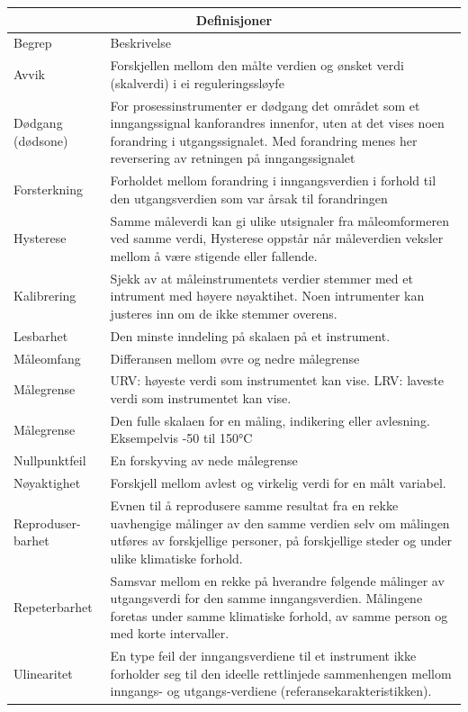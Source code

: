 \documentclass[10pt,a5paper]{article}
\begin{document}
\begin{center}
\begin{longtable}{ | m{2cm} | m{7cm} | } 
\hline
\multicolumn{2}{|c|}{Definisjoner} \\
\hline
Begrep	& Beskrivelse \\ 
\hline
\hline
	Avvik&Forskjellen mellom den målte verdien og ønsket verdi (skalverdi) i ei reguleringssløyfe\\
	\hline
	Dødgang (dødsone)&For prosessinstrumenter er dødgang det området som et inngangssignal kanforandres innenfor, uten at det vises noen forandring i utgangssignalet. Med forandring menes her reversering av retningen på inngangssignalet\\
	\hline
	Forsterkning&Forholdet mellom forandring i inngangsverdien i forhold til den utgangsverdien som var årsak til forandringen\\
	\hline
	Hysterese&Samme måleverdi kan gi ulike utsignaler fra måleomformeren ved samme verdi, Hysterese oppstår når måleverdien veksler mellom å være stigende eller fallende.\\
	\hline
	Kalibrering&Sjekk av at måleinstrumentets verdier stemmer med et intrument med høyere nøyaktihet. Noen intrumenter kan justeres inn om de ikke stemmer overens.\\ 
	\hline
	Lesbarhet&Den minste inndeling på skalaen på et instrument.\\
	\hline
	Måleomfang&Differansen mellom øvre og nedre målegrense\\
	\hline
	Målegrense&URV: høyeste verdi som instrumentet kan vise. LRV: laveste verdi som instrumentet kan vise. \\
	\hline
	Målegrense&Den fulle skalaen for en måling, indikering eller avlesning. Eksempelvis -50 til 150°C\\
	\hline
	Nullpunktfeil&En forskyving av nede målegrense\\
	\hline
	Nøyaktighet& Forskjell mellom avlest og virkelig verdi for en målt variabel.\\
	\hline

	Reproduser- barhet& Evnen til å reprodusere samme resultat fra en rekke uavhengige målinger av den samme verdien selv om målingen utføres av forskjellige personer, på forskjellige steder og under ulike klimatiske forhold.\\
	\hline
	Repeterbarhet&Samsvar mellom en rekke på hverandre følgende målinger av utgangsverdi for den samme inngangsverdien. Målingene foretas under samme klimatiske forhold, av samme person og med korte intervaller.\\
	\hline
	Ulinearitet&En type feil der inngangsverdiene til et instrument ikke forholder seg til den ideelle rettlinjede sammenhengen mellom inngangs- og utgangs-verdiene (referansekarakteristikken).\\
	\hline


\end{longtable}
\end{center}
\end{document}
